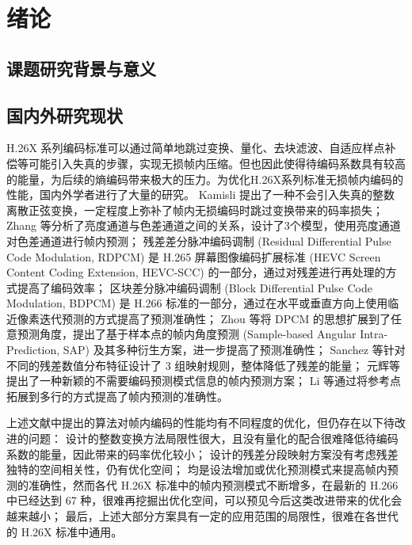 \chapter{绪论}
\label{cha:c1}

\section{课题研究背景与意义}

\section{国内外研究现状}
H.26X 系列编码标准可以通过简单地跳过变换、量化、去块滤波、自适应样点补偿等可能引入失真的步骤，实现无损帧内压缩。但也因此使得待编码系数具有较高的能量，为后续的熵编码带来极大的压力。为优化H.26X系列标准无损帧内编码的性能，国内外学者进行了大量的研究。
Kamisli 提出了一种不会引入失真的整数离散正弦变换，一定程度上弥补了帧内无损编码时跳过变换带来的码率损失；
Zhang 等分析了亮度通道与色差通道之间的关系，设计了3个模型，使用亮度通道对色差通道进行帧内预测；
残差差分脉冲编码调制 (Residual Differential Pulse Code Modulation, RDPCM) 是 H.265 屏幕图像编码扩展标准 (HEVC Screen Content Coding Extension, HEVC-SCC) 的一部分，通过对残差进行再处理的方式提高了编码效率；
区块差分脉冲编码调制 (Block Differential Pulse Code Modulation, BDPCM) 是 H.266 标准的一部分，通过在水平或垂直方向上使用临近像素迭代预测的方式提高了预测准确性；
Zhou 等将 DPCM 的思想扩展到了任意预测角度，提出了基于样本点的帧内角度预测 (Sample-based Angular Intra-Prediction, SAP) 及其多种衍生方案，进一步提高了预测准确性；
Sanchez 等针对不同的残差数值分布特征设计了 3 组映射规则，整体降低了残差的能量；
元辉等提出了一种新颖的不需要编码预测模式信息的帧内预测方案；
Li 等通过将参考点拓展到多行的方式提高了帧内预测的准确性。

上述文献中提出的算法对帧内编码的性能均有不同程度的优化，但仍存在以下待改进的问题：
\cite{LosslessI2ITransformTCSVT} 设计的整数变换方法局限性很大，且没有量化的配合很难降低待编码系数的能量，因此带来的码率优化较小；
\cite{pwmResidualsPiecewiseMapping,HEVCSCCOverview} 设计的残差分段映射方案没有考虑残差独特的空间相关性，仍有优化空间；
\cite{CrossComponentPredictionCCLM,SAP-SAPE,SAP-SAP1,SAP-SAPHVSWP2DTM,SAP-SAPHV,SAP-SAP,XiDianIntraPredictionH264,EfficientMultiplelinebasedIntra} 均是设法增加或优化预测模式来提高帧内预测的准确性，然而各代 H.26X 标准中的帧内预测模式不断增多，在最新的 H.266 中已经达到 67 种，很难再挖掘出优化空间，可以预见今后这类改进带来的优化会越来越小；
最后，上述大部分方案具有一定的应用范围的局限性，很难在各世代的 H.26X 标准中通用。

